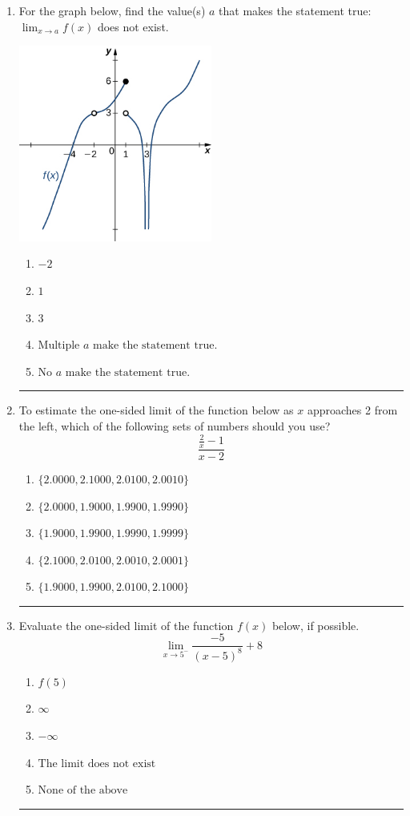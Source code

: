\documentclass[14pt]{extbook}
\newcommand{\litem}[1]{\item#1\hspace*{-1cm}\rule{\textwidth}{0.4pt}}
\begin{document}
\begin{enumerate}
{\begin{enumerate}[label=\Alph*.]
\end{enumerate} }
\litem{
For the graph below, find the value(s) $a$ that makes the statement true: $ \displaystyle \lim_{x \rightarrow a} f(x)$ does not exist.
\begin{center}
    \includegraphics[width=0.5\textwidth]{../Figures/evaluateLimitGraphicallyA.png}
\end{center}
\begin{enumerate}[label=\Alph*.]
\item \( -2 \)
\item \( 1 \)
\item \( 3 \)
\item \( \text{Multiple } a \text{ make the statement true}. \)
\item \( \text{No } a \text{ make the statement true}. \)

\end{enumerate} }
\litem{
To estimate the one-sided limit of the function below as $x$ approaches 2 from the left, which of the following sets of numbers should you use?\[ \frac{\frac{2}{x} - 1}{x - 2} \]\begin{enumerate}[label=\Alph*.]
\item \( \{ 2.0000, 2.1000, 2.0100, 2.0010 \} \)
\item \( \{ 2.0000, 1.9000, 1.9900, 1.9990 \} \)
\item \( \{ 1.9000, 1.9900, 1.9990, 1.9999 \} \)
\item \( \{ 2.1000, 2.0100, 2.0010, 2.0001 \} \)
\item \( \{ 1.9000, 1.9900, 2.0100, 2.1000 \} \)

\end{enumerate} }
\litem{
Evaluate the one-sided limit of the function $f(x)$ below, if possible.\[ \lim_{x \rightarrow 5^-} \frac{-5}{(x-5)^8}+8 \]\begin{enumerate}[label=\Alph*.]
\item \( f(5) \)
\item \( \infty \)
\item \( -\infty \)
\item \( \text{The limit does not exist} \)
\item \( \text{None of the above} \)

\end{enumerate} }
\end{enumerate}
\end{document}
